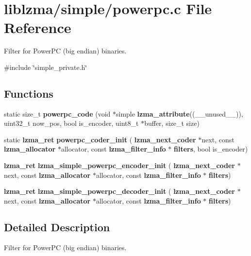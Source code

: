 \section{liblzma/simple/powerpc.c File Reference}
\label{powerpc_8c}


Filter for Power\+PC (big endian) binaries.  


{\ttfamily \#include \char`\"{}simple\+\_\+private.\+h\char`\"{}}\newline
\subsection*{Functions}
\begin{DoxyCompactItemize}
\item 
\mbox{\label{powerpc_8c_af74c622c3d1951d005e956fe5780c631}} 
static size\+\_\+t {\bfseries powerpc\+\_\+code} (void $\ast$simple \textbf{ lzma\+\_\+attribute}((\+\_\+\+\_\+unused\+\_\+\+\_\+)), uint32\+\_\+t now\+\_\+pos, bool is\+\_\+encoder, uint8\+\_\+t $\ast$buffer, size\+\_\+t size)
\item 
\mbox{\label{powerpc_8c_a63cff0f16c68a81ed216509968742bf3}} 
static \textbf{ lzma\+\_\+ret} {\bfseries powerpc\+\_\+coder\+\_\+init} (\textbf{ lzma\+\_\+next\+\_\+coder} $\ast$next, const \textbf{ lzma\+\_\+allocator} $\ast$allocator, const \textbf{ lzma\+\_\+filter\+\_\+info} $\ast$\textbf{ filters}, bool is\+\_\+encoder)
\item 
\mbox{\label{powerpc_8c_aefddcb4b5f1e4a20a43062acc3e72f26}} 
\textbf{ lzma\+\_\+ret} {\bfseries lzma\+\_\+simple\+\_\+powerpc\+\_\+encoder\+\_\+init} (\textbf{ lzma\+\_\+next\+\_\+coder} $\ast$next, const \textbf{ lzma\+\_\+allocator} $\ast$allocator, const \textbf{ lzma\+\_\+filter\+\_\+info} $\ast$\textbf{ filters})
\item 
\mbox{\label{powerpc_8c_a79c547328af2f05aaf36e0bdb4832b53}} 
\textbf{ lzma\+\_\+ret} {\bfseries lzma\+\_\+simple\+\_\+powerpc\+\_\+decoder\+\_\+init} (\textbf{ lzma\+\_\+next\+\_\+coder} $\ast$next, const \textbf{ lzma\+\_\+allocator} $\ast$allocator, const \textbf{ lzma\+\_\+filter\+\_\+info} $\ast$\textbf{ filters})
\end{DoxyCompactItemize}


\subsection{Detailed Description}
Filter for Power\+PC (big endian) binaries. 


